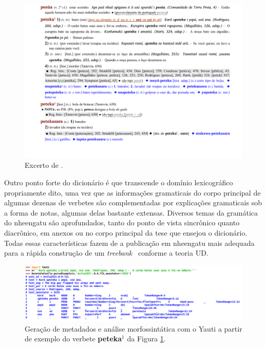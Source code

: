 \documentclass[portuguese]{textolivre}
\newcommand{\tb}{\textit{treebank}}
\begin{document}
\begin{figure}[htbp]
  \centering
  \begin{minipage}{.75\textwidth}
    \includegraphics[width=\linewidth]{figures/2021_MarcelTwardowskyAvila_VCorr_p593_excerpt.pdf}
    \caption{Excerto de \textcite[p. 592]{avila2021}.}
    \label{fig:verbetes}
  \end{minipage}
\end{figure}

Outro ponto forte do dicionário é que transcende o domínio lexicográfico propriamente dito, uma vez que as informações gramaticais do corpo principal de algumas dezenas de verbetes são complementadas por explicações gramaticais sob a forma de notas, algumas delas bastante extensas. Diversos temas da gramática do nheengatu são aprofundados, tanto do ponto de vista sincrônico quanto diacrônico, em anexos ou no corpo principal da tese que ensejou o dicionário. 
Todas essas características fazem de \textcite{avila2021} a publicação em nheengatu mais adequada para a rápida construção de um \tb~ conforme a teoria UD.  

\begin{figure}[htbp]
  \centering
  \begin{minipage}{.75\textwidth}
    \includegraphics[width=\linewidth]{figures/peteka-idle.pdf}
    \caption{Geração de metadados e análise morfossintática com o Yauti a partir de exemplo do verbete \textbf{peteka$^1$} da Figura \ref{fig:verbetes}.}
    \label{fig:peteka-idle}
  \end{minipage}
\end{figure}
\end{document}
